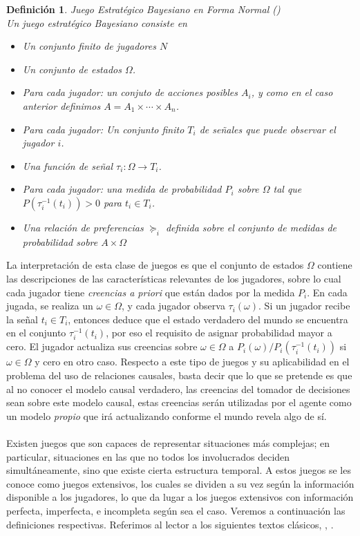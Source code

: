 \documentclass[11pt]{article}
\theoremstyle{plain}
\newtheorem{defi}[teo]{Definición}
\begin{document}
\begin{defi}{\label{juegobayesiano}}Juego Estratégico Bayesiano en Forma Normal (\cite{osborne1994course})\\
Un juego estratégico Bayesiano consiste en
\begin{itemize}
\item Un conjunto finito de jugadores $N$
\item Un conjunto de \textit{estados} $\Omega$.
\item Para cada jugador: un conjuto de acciones posibles $A_i$, y como en el caso anterior definimos $A = A_1 \times \cdots \times A_n$.
\item Para cada jugador: Un conjunto finito $T_i$ de señales que puede observar el jugador $i$.
\item Una función de señal $\tau_i : \Omega \to T_i$.
\item Para cada jugador: una medida de probabilidad $P_i$ sobre $\Omega$ tal que $P( \tau^{-1}_i (t_i)) >0$ para $t_i \in T_i$.
\item Una relación de preferencias $\succeq_i$ definida sobre el conjunto de medidas de probabilidad sobre $A \times \Omega$
\end{itemize}
\end{defi}
La interpretación de esta clase de juegos es que el conjunto de estados $\Omega$ contiene las descripciones de las características relevantes de los jugadores, sobre lo cual cada jugador tiene \textit{creencias a priori} que están dados por la medida $P_i$. En cada jugada, se realiza un $\omega \in \Omega$, y cada jugador observa $\tau_i (\omega)$. Si un jugador recibe la señal $t_i \in T_i$, entonces deduce que el estado verdadero del mundo se encuentra en el conjunto $\tau^{-1}_i (t_i)$, por eso el requisito de asignar probabilidad mayor a cero. El jugador actualiza sus creencias sobre $\omega \in \Omega$ a $P_i(\omega) / P_i(\tau^{-1}_i (t_i))$ si $\omega \in \Omega$ y cero en otro caso. Respecto a este tipo de juegos y su aplicabilidad en el problema del uso de relaciones causales, basta decir que lo que se pretende es que al no conocer el modelo causal verdadero, las creencias del tomador de decisiones sean sobre este modelo causal, estas creencias serán utilizadas por el agente como un modelo \textit{propio} que irá actualizando conforme el mundo revela algo de sí.\\
\\
Existen juegos que son capaces de representar situaciones más complejas; en particular, situaciones en las que no todos los involucrados deciden simultáneamente, sino que existe cierta estructura temporal. A estos juegos se les conoce como juegos extensivos, los cuales se dividen a su vez según la información disponible a los jugadores, lo que da lugar a los juegos extensivos con información perfecta, imperfecta, e incompleta según sea el caso. Veremos a continuación las definiciones respectivas. Referimos al lector a los siguientes textos clásicos\cite{osborne1994course}, \cite{shoham2008multiagent}, \cite{10.1007/978-94-010-0189-2_25}.
\end{document}
